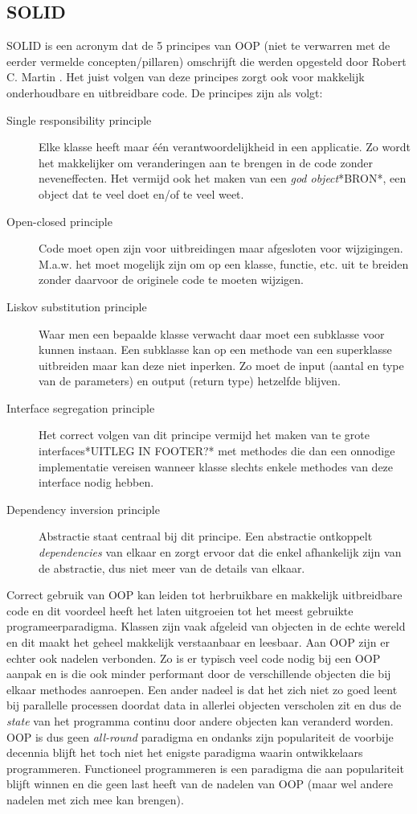 \subsection{SOLID}
SOLID is een acronym dat de 5 principes van OOP (niet te verwarren met de eerder vermelde concepten/pillaren) omschrijft die werden opgesteld door Robert C. Martin \autocite{Buysse2017-2018}.  Het juist volgen van deze principes zorgt ook voor makkelijk onderhoudbare en uitbreidbare code. De principes zijn als volgt:
\begin{description}
  \item [Single responsibility principle] Elke klasse heeft maar één verantwoordelijkheid in een applicatie. Zo wordt het makkelijker om veranderingen aan te brengen in de code zonder neveneffecten. Het vermijd ook het maken van een \textit{god object}*BRON*, een object dat te veel doet en/of te veel weet.
  \item [Open-closed principle] Code moet open zijn voor uitbreidingen maar afgesloten voor wijzigingen. M.a.w. het moet mogelijk zijn om op een klasse, functie, etc. uit te breiden zonder daarvoor de originele code te moeten wijzigen. 
  \item [Liskov substitution principle] Waar men een bepaalde klasse verwacht daar moet een subklasse voor kunnen instaan. Een subklasse kan op een methode van een superklasse uitbreiden maar kan deze niet inperken. Zo moet de input (aantal en type van de parameters) en output (return type) hetzelfde blijven.
  \item [Interface segregation principle] Het correct volgen van dit principe vermijd het maken van te grote interfaces*UITLEG IN FOOTER?* met methodes die dan een onnodige implementatie vereisen wanneer klasse slechts enkele methodes van deze interface nodig hebben.
  \item [Dependency inversion principle] Abstractie staat centraal bij dit principe. Een abstractie ontkoppelt \textit{dependencies} van elkaar en zorgt ervoor dat die enkel afhankelijk zijn van de abstractie, dus niet meer van de details van elkaar.
\end{description}

Correct gebruik van OOP kan leiden tot herbruikbare en makkelijk uitbreidbare code en dit voordeel heeft het laten uitgroeien tot het meest gebruikte programeerparadigma. Klassen zijn vaak afgeleid van objecten in de echte wereld en dit maakt het geheel makkelijk verstaanbaar en leesbaar. Aan OOP zijn er echter ook nadelen verbonden. Zo is er typisch veel code nodig bij een OOP aanpak en is die ook minder performant door de verschillende objecten die bij elkaar methodes aanroepen. Een ander nadeel is dat het zich niet zo goed leent bij parallelle processen doordat data in allerlei objecten verscholen zit en dus de \textit{state} van het programma continu door andere objecten kan veranderd worden. OOP is dus geen \textit{all-round} paradigma en ondanks zijn populariteit de voorbije decennia blijft het toch niet het enigste paradigma waarin ontwikkelaars programmeren. Functioneel programmeren is een paradigma die aan populariteit blijft winnen en die geen last heeft van de nadelen van OOP (maar wel andere nadelen met zich mee kan brengen).


